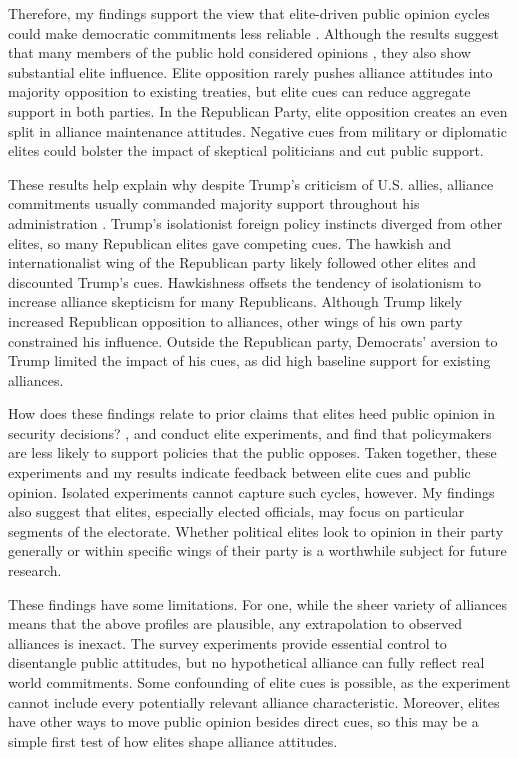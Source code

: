 \documentclass[12pt]{article}
\begin{document}
Therefore, my findings support the view that elite-driven public opinion cycles could make democratic commitments less reliable \citep{GartzkeGleditsch2004}. 
Although the results suggest that many members of the public hold considered opinions \citep{PageShapiro1992}, they also show substantial elite influence. 
Elite opposition rarely pushes alliance attitudes into majority opposition to existing treaties, but elite cues can reduce aggregate support in both parties.
In the Republican Party, elite opposition creates an even split in alliance maintenance attitudes. 
Negative cues from military or diplomatic elites could bolster the impact of skeptical politicians and cut public support. 


These results help explain why despite Trump's criticism of U.S. allies, alliance commitments usually commanded majority support throughout his administration \citep{PewNATO2020}. 
Trump's isolationist foreign policy instincts diverged from other elites, so many Republican elites gave competing cues.
The hawkish and internationalist wing of the Republican party likely followed other elites and discounted Trump's cues. 
Hawkishness offsets the tendency of isolationism to increase alliance skepticism for many Republicans.
Although Trump likely increased Republican opposition to alliances, other wings of his own party constrained his influence.
Outside the Republican party, Democrats' aversion to Trump limited the impact of his cues, as did high baseline support for existing alliances. 


How does these findings relate to prior claims that elites heed public opinion in security decisions?
\citet{Tomzetal2020}, \citet{LinGreenberg2021} and \citet{ChuRechhia2021} conduct elite experiments, and find that policymakers are less likely to support policies that the public opposes.
Taken together, these experiments and my results indicate feedback between elite cues and public opinion.
Isolated experiments cannot capture such cycles, however. 
My findings also suggest that elites, especially elected officials, may focus on particular segments of the electorate. 
Whether political elites look to opinion in their party generally or within specific wings of their party is a worthwhile subject for future research.


These findings have some limitations. 
For one, while the sheer variety of alliances means that the above profiles are plausible, any extrapolation to observed alliances is inexact. 
The survey experiments provide essential control to disentangle public attitudes, but no hypothetical alliance can fully reflect real world commitments.
Some confounding of elite cues is possible, as the experiment cannot include every potentially relevant alliance characteristic. 
Moreover, elites have other ways to move public opinion besides direct cues, so this may be a simple first test of how elites shape alliance attitudes. 
\end{document}
